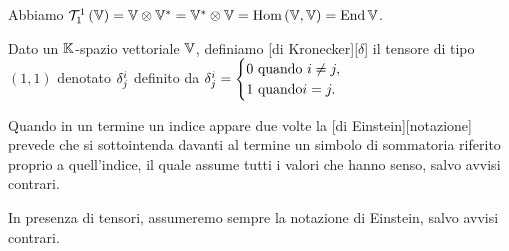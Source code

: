 \Proof Abbiamo $\mathcal{T}^{1}_{1} \left ( \mathbb{V} \right ) = \mathbb{V} \otimes {{\mathbb{V}}^*} = {{\mathbb{V}}^*} \otimes \mathbb{V} = \text{Hom}\left ( \mathbb{V}, \mathbb{V} \right ) = \operatorname{End}{\mathbb{V}}$. \EndProof
\begin{Definition}
	Dato un $\mathbb{K}$-spazio vettoriale $\mathbb{V}$, definiamo [di Kronecker][$\delta$] il tensore di tipo $(1,1)$ denotato $\delta^{i}_{j}$ definito da $\delta^{i}_{j} = \begin{cases}0\text{ quando }i \neq j,\\1\text{ quando}i = j.\end{cases}$
\end{Definition}
\begin{Definition}
	Quando in un termine un indice appare due volte la [di Einstein][notazione] prevede che si sottointenda davanti al termine un simbolo di sommatoria riferito proprio a quell'indice, il quale assume tutti i valori che hanno senso, salvo avvisi contrari.
\end{Definition}
\par In presenza di tensori, assumeremo sempre la notazione di Einstein, salvo avvisi contrari.
